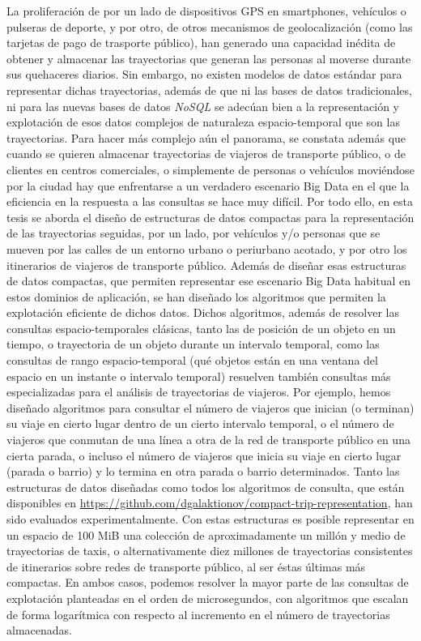 La proliferaci\'on de por un lado de dispositivos GPS en smartphones, veh\'iculos o pulseras de deporte,  y por otro, de otros mecanismos de geolocalizaci\'on (como las tarjetas de pago de trasporte p\'ublico), han generado una capacidad in\'edita de obtener y almacenar las trayectorias que generan las personas al moverse durante sus quehaceres diarios. Sin embargo, no existen modelos de datos est\'andar para representar dichas trayectorias, adem\'as de que ni las bases de datos tradicionales, ni para las nuevas bases de datos \textit{NoSQL} se adec\'uan bien a la representaci\'on y explotaci\'on de esos datos complejos de naturaleza espacio-temporal que son las trayectorias.  Para hacer m\'as complejo a\'un el panorama, se constata adem\'as que cuando se quieren almacenar trayectorias de viajeros de transporte p\'ublico, o de clientes en centros comerciales, o simplemente de personas o veh\'iculos movi\'endose por la ciudad hay que enfrentarse a un verdadero escenario Big Data en el que la eficiencia en la respuesta a las consultas se hace muy dif\'icil. 
Por todo ello, en esta tesis se aborda el dise\~no de estructuras de datos compactas para la representaci\'on de las trayectorias seguidas, por un lado, por veh\'iculos y/o personas que se mueven por las calles de un entorno urbano o periurbano acotado, y por otro los itinerarios de viajeros de transporte p\'ublico. Adem\'as de dise\~nar esas estructuras de datos compactas, que permiten representar ese escenario Big Data habitual en estos dominios de aplicaci\'on, se han dise\~nado los algoritmos que permiten la explotaci\'on eficiente de dichos datos.
Dichos algoritmos, adem\'as de resolver las consultas espacio-temporales cl\'asicas, tanto las de posici\'on de un objeto en un tiempo, o trayectoria de un objeto durante un intervalo temporal, como las consultas de rango espacio-temporal (qu\'e objetos est\'an en una ventana del espacio en un instante o intervalo temporal) resuelven tambi\'en consultas m\'as especializadas para el an\'alisis de trayectorias de viajeros. Por ejemplo, hemos dise\~nado algoritmos para  consultar el n\'umero de viajeros que inician (o terminan)  su viaje en cierto lugar dentro de un cierto intervalo temporal, o el n\'umero de viajeros que conmutan de una l\'inea a otra de la red de transporte p\'ublico en una cierta parada, o incluso el n\'umero de viajeros que inicia su viaje en cierto lugar (parada o  barrio) y lo termina en otra parada o barrio determinados. 
Tanto las estructuras de datos dise\~nadas como todos los algoritmos de consulta,  que  est\'an disponibles en \url{https://github.com/dgalaktionov/compact-trip-representation},  han sido evaluados experimentalmente. Con estas estructuras es posible representar en un espacio de 100 MiB una colecci\'on de aproximadamente un mill\'on y medio de trayectorias de taxis, o alternativamente diez millones de trayectorias consistentes de itinerarios sobre redes de transporte p\'ublico, al ser \'estas \'ultimas m\'as compactas. En ambos casos, podemos resolver la mayor parte de las consultas de explotaci\'on planteadas en el orden de microsegundos, con algoritmos que escalan de forma logar\'itmica con respecto al incremento en el n\'umero de trayectorias almacenadas.
